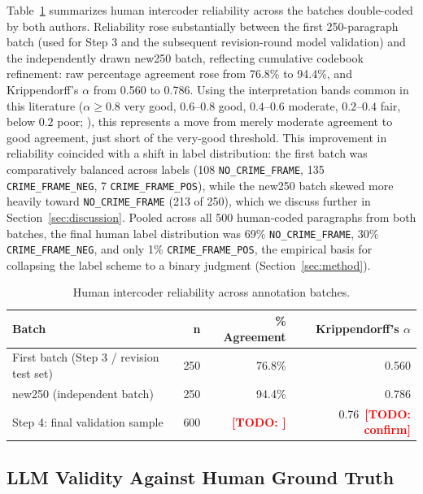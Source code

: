 \documentclass[a4paper,oneside,bibliography=totoc]{scrartcl}
\newcommand{\todo}[1]{\textcolor{red}{\textbf{[TODO: #1]}}}
\begin{document}
Table~\ref{tab:reliability} summarizes human intercoder reliability across the batches double-coded by both authors. Reliability rose substantially between the first 250-paragraph batch (used for Step 3 and the subsequent revision-round model validation) and the independently drawn new250 batch, reflecting cumulative codebook refinement: raw percentage agreement rose from 76.8\% to 94.4\%, and Krippendorff's $\alpha$ from 0.560 to 0.786. Using the interpretation bands common in this literature ($\alpha \geq 0.8$ very good, $0.6$--$0.8$ good, $0.4$--$0.6$ moderate, $0.2$--$0.4$ fair, below $0.2$ poor; \citealp{weberreichardt2023}), this represents a move from merely moderate agreement to good agreement, just short of the very-good threshold. This improvement in reliability coincided with a shift in label distribution: the first batch was comparatively balanced across labels (108 \texttt{NO\_CRIME\_FRAME}, 135 \texttt{CRIME\_FRAME\_NEG}, 7 \texttt{CRIME\_FRAME\_POS}), while the new250 batch skewed more heavily toward \texttt{NO\_CRIME\_FRAME} (213 of 250), which we discuss further in Section~\ref{sec:discussion}. Pooled across all 500 human-coded paragraphs from both batches, the final human label distribution was 69\% \texttt{NO\_CRIME\_FRAME}, 30\% \texttt{CRIME\_FRAME\_NEG}, and only 1\% \texttt{CRIME\_FRAME\_POS}, the empirical basis for collapsing the label scheme to a binary judgment (Section~\ref{sec:method}).

\begin{table}[htbp]
\centering
\begin{tabular}{lrrr}
\toprule
\textbf{Batch} & \textbf{n} & \textbf{\% Agreement} & \textbf{Krippendorff's $\alpha$} \\
\midrule
First batch (Step 3 / revision test set) & 250 & 76.8\% & 0.560 \\
new250 (independent batch)      & 250 & 94.4\% & 0.786 \\
Step 4: final validation sample & 600 & \todo{} & 0.76~\todo{confirm} \\
\bottomrule
\end{tabular}
\caption{Human intercoder reliability across annotation batches.}
\label{tab:reliability}
\end{table}

\subsection{LLM Validity Against Human Ground Truth}
\end{document}

